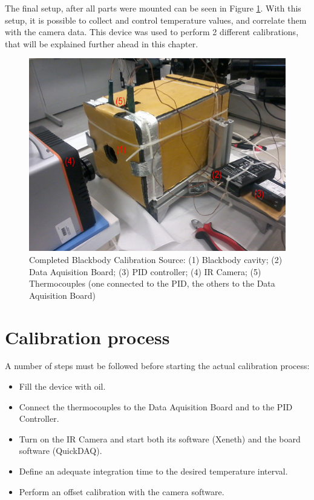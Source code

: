 \par The final setup, after all parts were mounted can be seen in Figure \ref{fig:bbcs}. With this setup, it is possible to collect and control temperature values, and correlate them with the camera data. This device was used to perform 2 different calibrations, that will be explained further ahead in this chapter. \\

\begin{figure}[h]
\centering
\includegraphics[width=0.7\linewidth]{Figures/4.Chapter/complete.png}
\caption{Completed Blackbody Calibration Source: (1) Blackbody cavity; (2) Data Aquisition Board; (3) PID controller; (4) IR Camera; (5) Thermocouples (one connected to the PID, the others to the Data Aquisition Board)}
\label{fig:bbcs}
\end{figure}

\section{Calibration process}

\par A number of steps must be followed before starting the actual calibration process:
\begin{itemize}
\item Fill the device with oil.
\item Connect the thermocouples to the Data Aquisition Board and to the PID Controller.
\item Turn on the IR Camera and start both its software (Xeneth) and the board software (QuickDAQ).
\item Define an adequate integration time to the desired temperature interval.
\item Perform an offset calibration with the camera software.
\end{itemize}

